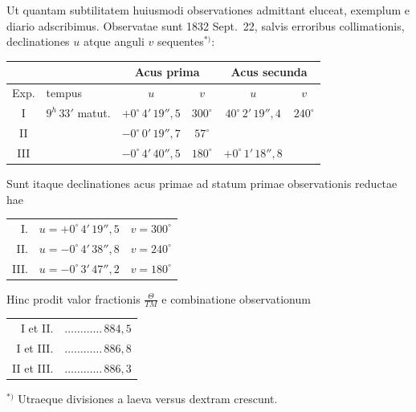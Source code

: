 \documentclass[fontsize=11pt,paper=a4,twoside,openany]{scrbook}
\begin{document}
\section{}

Ut quantam subtilitatem huiusmodi observationes admittant eluceat, exemplum e diario adscribimus. Observatae sunt 1832 Sept.~22, salvis erroribus collimationis, declinationes $u$ atque anguli $v$ sequentes$^{*)}$:

\begin{center}
\small
\begin{tabular}{|c|l|c|c|c|c|}
\hline
& & \multicolumn{2}{c|}{Acus prima} & \multicolumn{2}{c|}{Acus secunda} \\
\hline
Exp. & tempus & $u$ & $v$ & $u$ & $v$ \\
\hline
I & $9^h\,33'$ matut. & $+0^\circ\,4'\,19''{,}5$ & $300^\circ$ & $40^\circ\,2'\,19''{,}4$ & $240^\circ$ \\
II & & $-0^\circ\,0'\,19''{,}7$ & $57^\circ$ & & \\
III & & $-0^\circ\,4'\,40''{,}5$ & $180^\circ$ & $+0^\circ\,1'\,18''{,}8$ & \\
\hline
\end{tabular}
\end{center}

Sunt itaque declinationes acus primae ad statum primae observationis reductae hae
\begin{center}
\begin{tabular}{r@{~}l@{~}l}
I. & $u = +0^\circ\,4'\,19''{,}5$ & $v = 300^\circ$ \\
II. & $u = -0^\circ\,4'\,38''{,}8$ & $v = 240^\circ$ \\
III. & $u = -0^\circ\,3'\,47''{,}2$ & $v = 180^\circ$
\end{tabular}
\end{center}

Hinc prodit valor fractionis $\frac{\Theta}{TM}$ e combinatione observationum
\begin{center}
\begin{tabular}{r@{~}l}
I et II. & $\ldots\ldots\ldots\ldots\,884{,}5$ \\
I et III. & $\ldots\ldots\ldots\ldots\,886{,}8$ \\
II et III. & $\ldots\ldots\ldots\ldots\,886{,}3$
\end{tabular}
\end{center}

$^{*)}$ Utraeque divisiones a laeva versus dextram crescunt.
\end{document}
